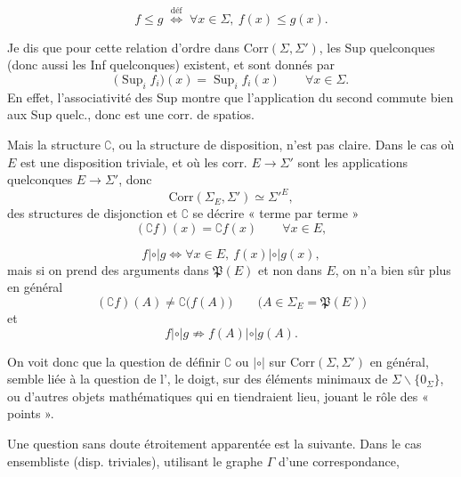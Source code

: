 \documentclass[11pt,a4paper]{article}
\begin{document}

\[
  f \le g \;\overset{\text{déf}}{\iff}\; \forall x \in \Sigma,\ f(x) \le g(x) .
\]

Je dis que pour cette relation d'ordre dans $\mathrm{Corr}(\Sigma,\Sigma')$, les Sup quelconques (donc aussi les Inf quelconques) existent, et sont donnés par
\[
  \bigl(\operatorname{Sup}_i f_i\bigr)(x) = \operatorname{Sup}_i f_i(x) \qquad \forall x \in \Sigma .
\]
En effet, l'associativité des Sup montre que l'application du second  commute bien aux Sup quelc., donc est une corr. de spatios.

Mais la structure $\complement$, ou la structure de disposition, n'est pas claire. Dans le cas où $E$ est une disposition triviale, \struck{\ill{}} et où les corr. $E \to \Sigma'$ sont  les applications quelconques $E \to \Sigma'$, donc
\[
  \mathrm{Corr}(\Sigma_E, \Sigma') \simeq \Sigma'^{E},
\]
des structures de disjonction et $\complement$  se décrire « terme par terme »
\[
  (\complement f)(x) = \complement f(x) \qquad \forall x \in E ,
\]

\[
  f \mathbin{|\circ|} g \iff \forall x \in E,\ f(x) \mathbin{|\circ|} g(x) ,
\]
mais si on prend des arguments dans $\mathfrak{P}(E)$ et non dans $E$, on n'a bien sûr plus en général
\[
  (\complement f)(A) \ne \complement\bigl(f(A)\bigr) \qquad \bigl(A \in \Sigma_E = \mathfrak{P}(E)\bigr)
\]
et
\[
  f \mathbin{|\circ|} g \not\Longrightarrow f(A) \mathbin{|\circ|} g(A) .
\]

On voit donc que la question de définir $\complement$ ou $\mathbin{|\circ|}$ sur $\mathrm{Corr}(\Sigma,\Sigma')$ en général, semble liée à la question de l',  le doigt,  sur des éléments minimaux de $\Sigma \smallsetminus \{0_\Sigma\}$, ou d'autres objets mathématiques qui en tiendraient lieu, jouant le rôle des « points ».

Une question sans doute étroitement apparentée est la suivante. Dans le cas ensembliste (disp. triviales), utilisant le graphe $\Gamma$  d'une correspondance, 
\end{document}
